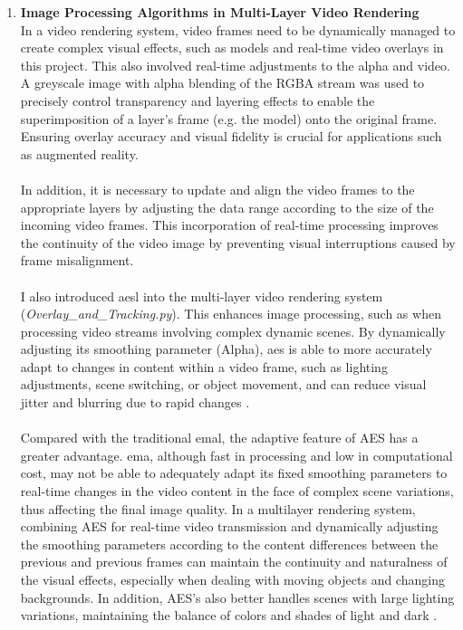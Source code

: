 \documentclass[12pt]{article}
\begin{document}
\begin{enumerate}
\begin{enumerate}
                  \item \textbf{Image Processing Algorithms in Multi-Layer Video Rendering}
                        \\ In a video rendering system, video frames need to be dynamically managed to create complex visual effects, such as models and real-time video overlays in this project. This also involved real-time adjustments to the \gls{alpha}\cite{Alpha} and video. A greyscale image with alpha blending of the RGBA stream was used to precisely control transparency and layering effects to enable the superimposition of a layer's frame (e.g. the model) onto the original frame\cite{9979846}. Ensuring overlay accuracy and visual fidelity is crucial for applications such as augmented reality\cite{SETTIMI2022104272}.
                        \\\\
                        In addition, it is necessary to update and align the video frames to the appropriate layers by adjusting the data range according to the size of the incoming video frames. This incorporation of real-time processing improves the continuity of the video image by preventing visual interruptions caused by frame misalignment\cite{Wang}.
                        \\\\
                        I also introduced \gls{aesl} into the multi-layer video rendering system (\emph{Overlay\_and\_Tracking.py}). This enhances image processing, such as when processing video streams involving complex dynamic scenes\cite{7410724}. By dynamically adjusting its smoothing parameter (Alpha), \gls{aes} is able to more accurately adapt to changes in content within a video frame, such as lighting adjustments, scene switching, or object movement, and can reduce visual jitter and blurring due to rapid changes \cite{7410724}.
                        \\\\
                        Compared with the traditional \gls{emal}, the adaptive feature of AES has a greater advantage. \gls{ema}, although fast in processing and low in computational cost, may not be able to adequately adapt its fixed smoothing parameters to real-time changes in the video content in the face of complex scene variations, thus affecting the final image quality\cite{aes,aes2,InvestopediaEMA}.
                        In a multilayer rendering system, combining AES for real-time video transmission and dynamically adjusting the smoothing parameters according to the content differences between the previous and previous frames can maintain the continuity and naturalness of the visual effects, especially when dealing with moving objects and changing backgrounds. In addition, AES's also better handles scenes with large lighting variations, maintaining the balance of colors and shades of light and dark \cite{7298776}.

\end{enumerate}
\end{enumerate}
\end{document}
